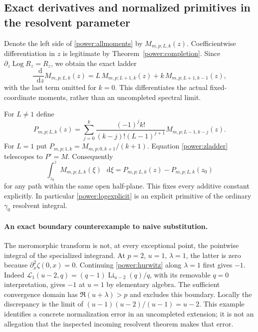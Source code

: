 \documentclass[11pt,a4paper]{article}
\numberwithin{equation}{section}
\theoremstyle{definition}
\theoremstyle{remark}
\DeclareMathOperator{\Li}{Li}
\DeclareMathOperator{\Log}{Log}
\newcommand{\dd}{\mathop{}\!\mathrm{d}}
\begin{document}
\subsection{Exact derivatives and normalized primitives in the resolvent parameter}

Denote the left side of \eqref{power:allmoments} by
$M_{m,p;L,k}(z)$.  Coefficientwise differentiation in $z$ is legitimate
by Theorem~\ref{power:completion}.  Since
$\partial_z\Log R_z=R_z$, we obtain the exact ladder
\begin{equation}\label{power:zladder}
 \frac{\dd}{\dd z}M_{m,p;L,k}(z)
    =L\,M_{m,p;L+1,k}(z)+k\,M_{m,p;L+1,k-1}(z),
\end{equation}
with the last term omitted for $k=0$.  This differentiates the actual
fixed-coordinate moments, rather than an uncompleted spectral limit.

For $L\ne1$ define
\begin{equation}\label{power:primitive}
 P_{m,p;L,k}(z)=
 \sum_{j=0}^k\frac{(-1)^jk!}{(k-j)!(L-1)^{j+1}}
                         M_{m,p;L-1,k-j}(z).
\end{equation}
For $L=1$ put $P_{m,p;1,k}=M_{m,p;0,k+1}/(k+1)$.
Equation \eqref{power:zladder} telescopes to $P'=M$.
Consequently
\begin{equation}\label{power:normalizedprimitive}
 \int_{z_0}^{z}M_{m,p;L,k}(\xi)\,\dd\xi
       =P_{m,p;L,k}(z)-P_{m,p;L,k}(z_0)
\end{equation}
for any path within the same open half-plane.  This fixes every additive
constant explicitly.  In particular \eqref{power:logexplicit} is an
explicit primitive of the ordinary $\gamma_0$ resolvent integral.

\paragraph{An exact boundary counterexample to naive substitution.}
The meromorphic transform is not, at every exceptional point, the
pointwise integral of the specialized integrand.  At $p=2$, $u=1$,
$\lambda=1$, the latter is zero because
$\partial_x^2\zeta(0,x)=0$.  Continuing \eqref{power:hurwitz} along
$\lambda=1$ first gives $-1$.  Indeed
$\mathcal L_1(u-2,q)=(q-1)\Li_{u-2}(q)/q$, with its removable
$q=0$ interpretation, gives $-1$ at $u=1$ by elementary algebra.
The sufficient convergence domain has $\Re(u+\lambda)>p$ and
excludes this boundary.  Locally the discrepancy is the limit of
$(u-1)(u-2)/(u-1)=u-2$.  This example identifies a concrete
normalization error in an uncompleted extension; it is not an allegation
that the inspected incoming resolvent theorem makes that error.
\end{document}
